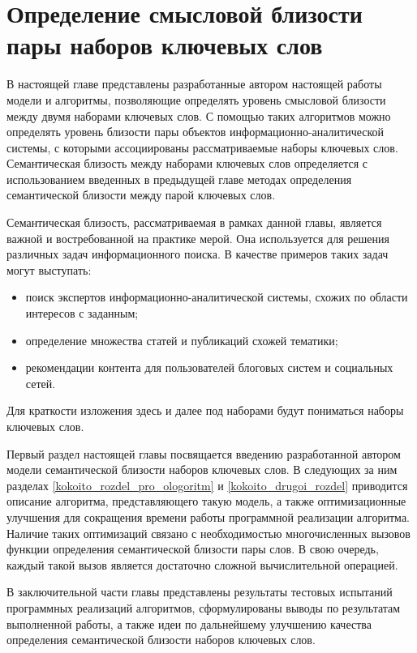 \chapter{Определение смысловой близости пары наборов ключевых слов} \label{chapt_tuple_similarity}

В настоящей главе представлены разработанные автором настоящей работы модели и алгоритмы, позволяющие  определять уровень смысловой близости между двумя наборами ключевых слов.  С помощью таких алгоритмов можно определять уровень близости пары объектов информационно-аналитической системы, с которыми ассоциированы рассматриваемые наборы ключевых слов.
Семантическая близость между наборами ключевых слов определяется с использованием введенных в предыдущей главе методах определения семантической близости между парой ключевых слов.

Семантическая близость, рассматриваемая в рамках данной главы, является важной и востребованной на практике мерой. Она используется для решения различных задач информационного поиска. В качестве примеров таких задач могут выступать:
\begin{itemize}
    \item поиск экспертов информационно-аналитической системы, схожих по области интересов с заданным;
    \item определение множества статей и публикаций схожей тематики;
    \item рекомендации контента для пользователей блоговых систем и социальных сетей.
\end{itemize}

Для краткости изложения здесь и далее под наборами будут пониматься наборы ключевых слов.

Первый раздел настоящей главы посвящается введению разработанной автором модели семантической близости наборов ключевых слов. В следующих за ним разделах \ref{kokoito_rozdel_pro_ologoritm} и \ref{kokoito_drugoi_rozdel} приводится описание алгоритма, представляющего такую модель, а также оптимизационные улучшения для сокращения времени работы программной реализации алгоритма. Наличие таких оптимизаций связано с необходимостью многочисленных вызовов функции определения семантической близости пары слов. В свою очередь, каждый такой вызов является достаточно сложной вычислительной операцией.

В заключительной части главы представлены результаты тестовых испытаний программных реализаций алгоритмов, сформулированы выводы по результатам выполненной работы, а также идеи по дальнейшему улучшению качества определения семантической близости наборов ключевых слов.


